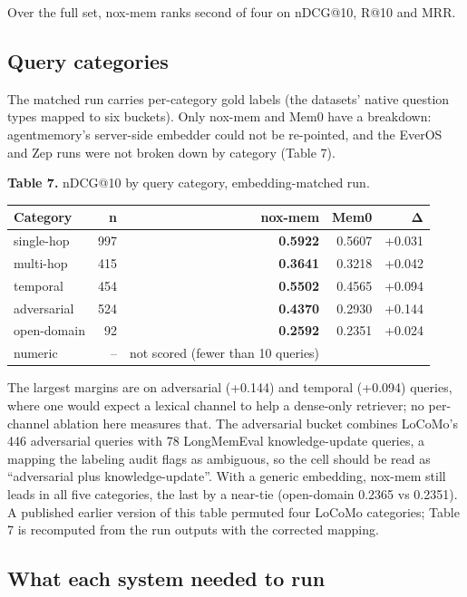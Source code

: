 \documentclass[a4paper,fleqn]{cas-sc}
\newcounter{none}  %
\begin{document}
Over the full set, nox-mem ranks second of four on nDCG@10, R@10 and MRR.

\subsection{Query categories}

The matched run carries per-category gold labels (the datasets' native question types mapped to six buckets). Only nox-mem and Mem0 have a breakdown: agentmemory's server-side embedder could not be re-pointed, and the EverOS and Zep runs were not broken down by category (Table 7).

\textbf{Table 7.} nDCG@10 by query category, embedding-matched run.

{\def\LTcaptype{none} %
\begin{longtable}{@{}lrrrr@{}}
\toprule\noalign{}
Category & n & nox-mem & Mem0 & Δ \\
\midrule\noalign{}
\endhead
\bottomrule\noalign{}
\endlastfoot
single-hop & 997 & \textbf{0.5922} & 0.5607 & +0.031 \\
multi-hop & 415 & \textbf{0.3641} & 0.3218 & +0.042 \\
temporal & 454 & \textbf{0.5502} & 0.4565 & +0.094 \\
adversarial & 524 & \textbf{0.4370} & 0.2930 & +0.144 \\
open-domain & 92 & \textbf{0.2592} & 0.2351 & +0.024 \\
numeric & -- & not scored (fewer than 10 queries) & & \\
\end{longtable}
}

The largest margins are on adversarial (+0.144) and temporal (+0.094) queries, where one would expect a lexical channel to help a dense-only retriever; no per-channel ablation here measures that. The adversarial bucket combines LoCoMo's 446 adversarial queries with 78 LongMemEval knowledge-update queries, a mapping the labeling audit flags as ambiguous, so the cell should be read as ``adversarial plus knowledge-update''. With a generic embedding, nox-mem still leads in all five categories, the last by a near-tie (open-domain 0.2365 vs 0.2351). A published earlier version of this table permuted four LoCoMo categories; Table 7 is recomputed from the run outputs with the corrected mapping.

\subsection{What each system needed to run}
\end{document}
